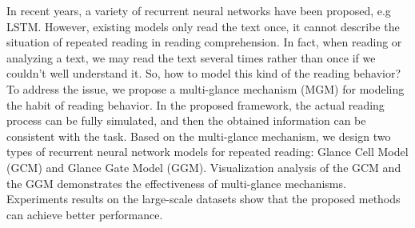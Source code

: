 In recent years, a variety of recurrent neural networks have been proposed, e.g LSTM. However, existing models only read the text once, it cannot describe the situation of repeated reading in reading comprehension. In fact, when reading or analyzing a text, we may read the text several times rather than once if we couldn't well understand it. So, how to model this kind of the reading behavior? To address the issue, we propose a multi-glance mechanism (MGM) for modeling the habit of reading behavior. In the proposed framework, the actual reading process can be fully simulated, and then the obtained information can be consistent with the task.  Based on the multi-glance mechanism, we design two types of recurrent neural network models for repeated reading: Glance Cell Model (GCM) and Glance Gate Model (GGM). Visualization analysis of the GCM and the GGM demonstrates the effectiveness of multi-glance mechanisms. Experiments results on the large-scale datasets show that the proposed methods can achieve better performance.
